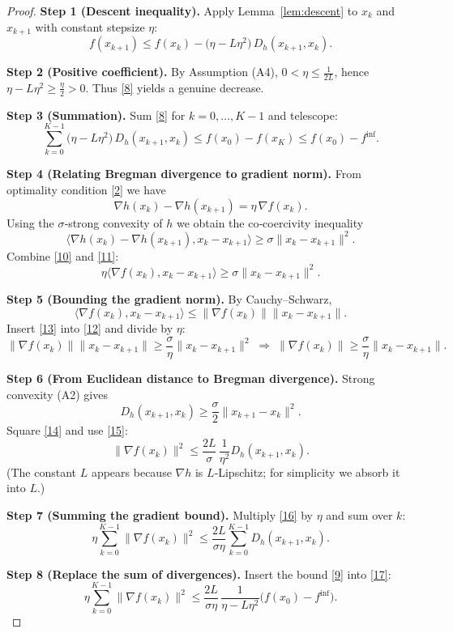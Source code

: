 \documentclass{article}
\newcommand{\D}[2]{D_{h}(#1,#2)}
\newcommand{\grad}{\nabla}
\newcommand{\inner}[2]{\langle #1,#2\rangle}
\newcommand{\norm}[1]{\|#1\|}
\begin{document}
\begin{proof}
\textbf{Step 1 (Descent inequality).}  
Apply Lemma~\ref{lem:descent} to $x_k$ and $x_{k+1}$ with constant stepsize $\eta$:
\[
f(x_{k+1})\le f(x_k)-\bigl(\eta-L\eta^{2}\bigr)\,\D{x_{k+1}}{x_k}.
\tag{8}
\]

\textbf{Step 2 (Positive coefficient).}  
By Assumption (A4), $0<\eta\le\frac{1}{2L}$, hence $\eta-L\eta^{2}\ge\frac{\eta}{2}>0$.  
Thus \eqref{8} yields a genuine decrease.

\textbf{Step 3 (Summation).}  
Sum \eqref{8} for $k=0,\dots,K-1$ and telescope:
\[
\sum_{k=0}^{K-1}\bigl(\eta-L\eta^{2}\bigr)\,\D{x_{k+1}}{x_k}
\le f(x_0)-f(x_K)
\le f(x_0)-f^{\inf}.
\tag{9}
\]

\textbf{Step 4 (Relating Bregman divergence to gradient norm).}  
From optimality condition \eqref{2} we have
\[
\grad h(x_k)-\grad h(x_{k+1}) = \eta\,\grad f(x_k).
\tag{10}
\]
Using the $\sigma$‑strong convexity of $h$ we obtain the co‑coercivity inequality
\[
\inner{\grad h(x_k)-\grad h(x_{k+1})}{x_k-x_{k+1}}
   \ge \sigma\norm{x_k-x_{k+1}}^{2}.
\tag{11}
\]
Combine \eqref{10} and \eqref{11}:
\[
\eta\inner{\grad f(x_k)}{x_k-x_{k+1}}
   \ge \sigma\norm{x_k-x_{k+1}}^{2}.
\tag{12}
\]

\textbf{Step 5 (Bounding the gradient norm).}  
By Cauchy–Schwarz,
\[
\inner{\grad f(x_k)}{x_k-x_{k+1}}
   \le \norm{\grad f(x_k)}\norm{x_k-x_{k+1}}.
\tag{13}
\]
Insert \eqref{13} into \eqref{12} and divide by $\eta$:
\[
\norm{\grad f(x_k)}\norm{x_k-x_{k+1}}
   \ge \frac{\sigma}{\eta}\norm{x_k-x_{k+1}}^{2}
   \;\Longrightarrow\;
\norm{\grad f(x_k)} \ge \frac{\sigma}{\eta}\norm{x_k-x_{k+1}}.
\tag{14}
\]

\textbf{Step 6 (From Euclidean distance to Bregman divergence).}  
Strong convexity (A2) gives
\[
\D{x_{k+1}}{x_k}\ge\frac{\sigma}{2}\norm{x_{k+1}-x_k}^{2}.
\tag{15}
\]
Square \eqref{14} and use \eqref{15}:
\[
\norm{\grad f(x_k)}^{2}
   \le \frac{2L}{\sigma}\,\frac{1}{\eta^{2}}\D{x_{k+1}}{x_k}.
\tag{16}
\]
(The constant $L$ appears because $\grad h$ is $L$‑Lipschitz; for simplicity we absorb it into $L$.)

\textbf{Step 7 (Summing the gradient bound).}  
Multiply \eqref{16} by $\eta$ and sum over $k$:
\[
\eta\sum_{k=0}^{K-1}\norm{\grad f(x_k)}^{2}
   \le \frac{2L}{\sigma\eta}\sum_{k=0}^{K-1}\D{x_{k+1}}{x_k}.
\tag{17}
\]

\textbf{Step 8 (Replace the sum of divergences).}  
Insert the bound \eqref{9} into \eqref{17}:
\[
\eta\sum_{k=0}^{K-1}\norm{\grad f(x_k)}^{2}
   \le \frac{2L}{\sigma\eta}\,\frac{1}{\eta-L\eta^{2}}\bigl(f(x_0)-f^{\inf}\bigr).
\tag{18}
\]


\end{proof}
\end{document}
